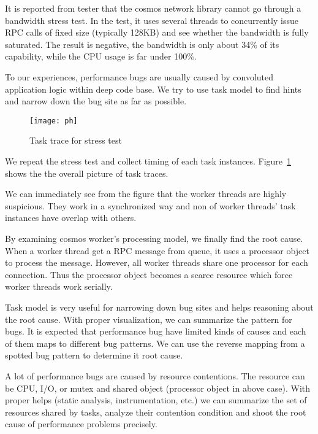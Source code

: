 It is reported from tester that the cosmos network library
cannot go through a bandwidth stress test. In the test,
it uses several threads to concurrently issue RPC calls of
fixed size (typically 128KB) and see whether the bandwidth
is fully saturated. The result is negative, the bandwidth is
only about 34\% of its capability, while the CPU usage is
far under 100\%.

To our experiences, performance bugs are usually caused by
convoluted application logic within deep code base. We try
to use task model to find hints and narrow down the bug site
as far as possible.

\begin{figure}
\centering
\texttt{[image: ph]}
\caption{Task trace for stress test}
\label{fig:stresstest}
\end{figure}

We repeat the stress test and collect timing of each task
instances. Figure~\ref{fig:stresstest} shows the the overall
picture of task traces.

We can immediately see from the figure that the worker
threads are highly suspicious. They work in a synchronized
way and non of worker threads' task instances have overlap
with others.

By examining cosmos worker's processing model, we finally
find the root cause. When a worker thread get a RPC message
from queue, it uses a processor object to process the
message. However, all worker threads share one processor for
each connection. Thus the processor object becomes a scarce
resource which force worker threads work serially.

\lesson Task model is very useful for narrowing down bug
sites and helps reasoning about the root cause. With proper
visualization, we can summarize the pattern for bugs. It is
expected that performance bug have limited kinds of causes
and each of them maps to different bug patterns. We can use
the reverse mapping from a spotted bug pattern to determine
it root cause.

A lot of performance bugs are caused by resource
contentions. The resource can be CPU, I/O, or mutex and
shared object (processor object in above case). With proper
helps (static analysis, instrumentation, etc.) we can
summarize the set of resources shared by tasks, analyze
their contention condition and shoot the root cause of
performance problems precisely.

